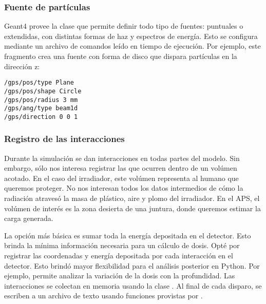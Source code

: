 \subsubsection{Fuente de partículas}
Geant4 provee la clase 
que permite definir todo tipo de fuentes:
puntuales o extendidas, con distintas formas de haz y espectros de energía.
Esto se configura mediante un archivo de comandos 
leído en tiempo de ejecución.
Por ejemplo, este fragmento crea una fuente 
con forma de disco que dispara partículas en la dirección z:
\begin{verbatim}
/gps/pos/type Plane
/gps/pos/shape Circle
/gps/pos/radius 3 mm
/gps/ang/type beam1d
/gps/direction 0 0 1
\end{verbatim}
\subsubsection{Registro de las interacciones}
Durante la simulación se dan interacciones en todas partes del modelo.
Sin embargo, sólo nos interesa registrar 
las que ocurren dentro de un volúmen acotado.
En el caso del irradiador, este volúmen representa al humano que queremos
proteger.
No nos interesan todos los datos intermedios de cómo la radiación atravesó 
la masa de plástico, aire y plomo del irradiador. 
En el APS, el volúmen de interés es la zona desierta de una juntura, 
donde queremos estimar la carga generada.

La opción más básica es sumar toda la energía depositada en el detector.
Esto brinda la mínima información necesaria para un cálculo de dosis.
Opté por registrar las coordenadas y energía depositada
por cada interacción en el detector.
Esto brindó mayor flexibilidad para el análisis posterior en Python.
Por ejemplo, permite analizar la variación de la dosis con la profundidad.
Las interacciones se colectan en memoria usando la clase .
Al final de cada disparo, se escriben a un archivo de texto
usando funciones provistas por .
